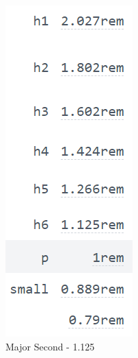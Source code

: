 \begin{figure}[h]
    \centering
    \begin{minipage}{0.45\textwidth}
        \centering
        \includegraphics[width=0.5\linewidth]{images/typography-major-second.png}
        \caption{Major Second - 1.125}
        \label{fig:figure6}
    \end{minipage}%
    \hspace{0.1\textwidth}%
    \begin{minipage}{0.45\textwidth}
        \centering

\end{minipage}
\end{figure}
